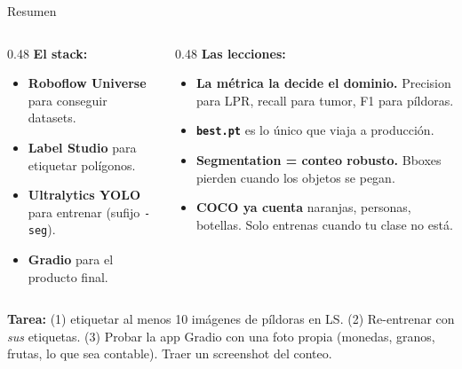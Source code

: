 \documentclass[aspectratio=169, 11pt]{beamer}
\begin{document}
\begin{frame}[shrink]{Resumen}
  \vspace{6pt}
  \begin{columns}[T]
    \begin{column}{0.48\textwidth}
      {\footnotesize\bfseries\color{arcaDark} El stack:}
      \vspace{4pt}

      {\scriptsize
      \begin{itemize}\setlength{\itemsep}{4pt}
        \item \textbf{Roboflow Universe} para conseguir datasets.
        \item \textbf{Label Studio} para etiquetar pol\'igonos.
        \item \textbf{Ultralytics YOLO} para entrenar (sufijo \texttt{-seg}).
        \item \textbf{Gradio} para el producto final.
      \end{itemize}
      }
    \end{column}
    \begin{column}{0.48\textwidth}
      {\footnotesize\bfseries\color{arcaDark} Las lecciones:}
      \vspace{4pt}

      {\scriptsize
      \begin{itemize}\setlength{\itemsep}{4pt}
        \item \textbf{La m\'etrica la decide el dominio.} Precision para LPR,
              recall para tumor, F1 para p\'ildoras.
        \item \textbf{\texttt{best.pt}} es lo \'unico que viaja a producci\'on.
        \item \textbf{Segmentation = conteo robusto.} Bboxes pierden cuando los
              objetos se pegan.
        \item \textbf{COCO ya cuenta} naranjas, personas, botellas. Solo entrenas
              cuando tu clase no est\'a.
      \end{itemize}
      }
    \end{column}
  \end{columns}

  \vspace{12pt}
  \begin{tcolorbox}[colback=codeGreen!8, colframe=codeGreen, boxrule=0.5pt,
    arc=2pt, left=6pt, right=6pt, top=4pt, bottom=4pt]
    {\scriptsize\color{arcaDark}
    \faKey\hspace{4pt}\textbf{Tarea:} (1) etiquetar al menos 10 im\'agenes de
    p\'ildoras en LS. (2) Re-entrenar con \emph{sus} etiquetas. (3) Probar
    la app Gradio con una foto propia (monedas, granos, frutas, lo que
    sea contable). Traer un screenshot del conteo.}
  \end{tcolorbox}
\end{frame}
\end{document}
